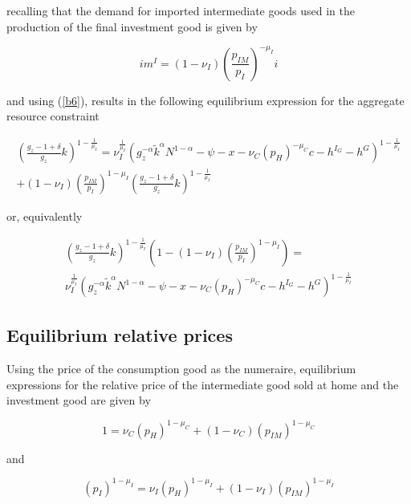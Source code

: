 \documentclass[a4paper,11pt]{article}
\numberwithin{equation}{section}
\begin{document}
	recalling that the demand for imported intermediate goods used in the production of the final investment good is given by
	
	\begin{equation}
	im^I=\left(1-\nu_I\right)\left(\frac{p_{IM}}{p_I}\right)^{-\mu_I}i
	\end{equation}	
	
	and using (\ref{b6}), results in the following equilibrium expression for the aggregate resource constraint
	
	\begin{multline}
	\left(\frac{g_z-1+\delta}{g_z}k\right)^{1-\frac{1}{\mu_I}}=\nu_I^{\frac{1}{\mu_I}}\left(g_z^{-\alpha}\tilde{k}^{\alpha}N^{1-\alpha}-\psi-x-\nu_C\left(p_H\right)^{-\mu_C}c-h^{I_G}-h^G\right)^{1-\frac{1}{\mu_I}}\\
	+\left(1-\nu_I\right)\left(\frac{p_{IM}}{p_I}\right)^{1-\mu_I}\left(\frac{g_z-1+\delta}{g_z}k\right)^{1-\frac{1}{\mu_I}}
	\end{multline}
	
	or, equivalently
	
	\begin{multline} \label{ss_goods}
	\left(\frac{g_z-1+\delta}{g_z}k\right)^{1-\frac{1}{\mu_I}}\left(1-\left(1-\nu_I\right)\left(\frac{p_{IM}}{p_I}\right)^{1-\mu_I}\right)=\\
	\nu_I^{\frac{1}{\mu_I}}\left(g_z^{-\alpha}\tilde{k}^{\alpha}N^{1-\alpha}-\psi-x-\nu_C\left(p_H\right)^{-\mu_C}c-h^{I_G}-h^G\right)^{1-\frac{1}{\mu_I}}
	\end{multline}
	
	\subsection{Equilibrium relative prices}

	Using the price of the consumption good as the numeraire, equilibrium expressions for the relative price of the intermediate good sold at home and the investment good are given by
	
	\begin{equation} \label{b28}
	1=\nu_C\left(p_H\right)^{1-\mu_C}+\left(1-\nu_C\right)\left(p_{IM}\right)^{1-\mu_C}
	\end{equation}
	
	and
	
	\begin{equation} \label{b29}
	\left(p_I\right)^{1-\mu_I}=\nu_I\left(p_H\right)^{1-\mu_I}+\left(1-\nu_I\right)\left(p_{IM}\right)^{1-\mu_I}
	\end{equation}
	
\end{document}
